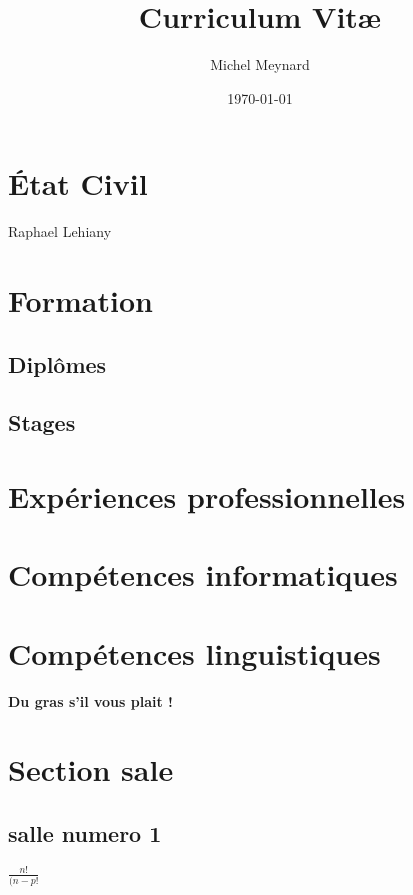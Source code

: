 \documentclass[a4paper]{article}
\title{Curriculum Vit\ae}
\author{Michel Meynard}
\date{\today}
\begin{document}
\maketitle
\section{\'Etat Civil}
Raphael Lehiany
\section{Formation}
\subsection{Diplômes}
\subsection{Stages}
\section{Expériences professionnelles}
\section*{Compétences informatiques}
\section*{Compétences linguistiques}
\textbf{Du gras s'il vous plait !}

\section{Section sale}


\subsection{salle numero 1}


\begin{math}
  \frac{n!}{(n-p!}
\end{math}
\end{document}
